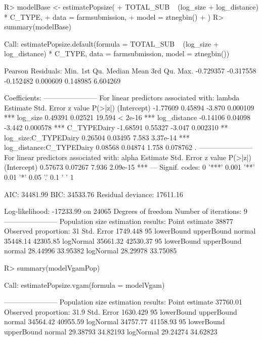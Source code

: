 \documentclass[
]{jss}
\newcommand{\1}{\mathcal{I}} \newcommand{\bZero}{\boldsymbol{0}}
\begin{document}
\begin{CodeChunk}
\begin{CodeInput}
R> modelBase <- estimatePopsize(
+   TOTAL_SUB ~ (log_size + log_distance) * C_TYPE,
+   data = farmsubmission,
+   model = ztnegbin()
+ )
R> summary(modelBase)
\end{CodeInput}
\begin{CodeOutput}

Call:
estimatePopsize.default(formula = TOTAL_SUB ~ (log_size + log_distance) * 
    C_TYPE, data = farmsubmission, model = ztnegbin())

Pearson Residuals:
     Min.   1st Qu.    Median      Mean   3rd Qu.      Max. 
-0.729357 -0.317558 -0.152482  0.000609  0.148985  6.604269 

Coefficients:
-----------------------
For linear predictors associated with: lambda 
                         Estimate Std. Error z value  P(>|z|)    
(Intercept)              -1.77609    0.45894  -3.870 0.000109 ***
log_size                  0.49391    0.02521  19.594  < 2e-16 ***
log_distance             -0.14106    0.04098  -3.442 0.000578 ***
C_TYPEDairy              -1.68591    0.55327  -3.047 0.002310 ** 
log_size:C_TYPEDairy      0.26504    0.03495   7.583 3.37e-14 ***
log_distance:C_TYPEDairy  0.08568    0.04874   1.758 0.078762 .  
-----------------------
For linear predictors associated with: alpha 
            Estimate Std. Error z value  P(>|z|)    
(Intercept)  0.57673    0.07267   7.936 2.09e-15 ***
---
Signif. codes:  0 '***' 0.001 '**' 0.01 '*' 0.05 '.' 0.1 ' ' 1

AIC: 34481.99
BIC: 34533.76
Residual deviance: 17611.16

Log-likelihood: -17233.99 on 24065 Degrees of freedom 
Number of iterations: 9
-----------------------
Population size estimation results: 
Point estimate 38877
Observed proportion: 31%
Std. Error 1749.448
95%
          lowerBound upperBound
normal      35448.14   42305.85
logNormal   35661.32   42530.37
95%
          lowerBound upperBound
normal      28.44996   33.95382
logNormal   28.29978   33.75085
\end{CodeOutput}
\begin{CodeInput}
R> summary(modelVgamPop)
\end{CodeInput}
\begin{CodeOutput}

Call:
estimatePopsize.vgam(formula = modelVgam)

-----------------------
Population size estimation results: 
Point estimate 37760.01
Observed proportion: 31.9%
Std. Error 1630.429
95%
          lowerBound upperBound
normal      34564.42   40955.59
logNormal   34757.77   41158.93
95%
          lowerBound upperBound
normal      29.38793   34.82193
logNormal   29.24274   34.62823


\end{CodeOutput}
\end{CodeChunk}
\end{document}
